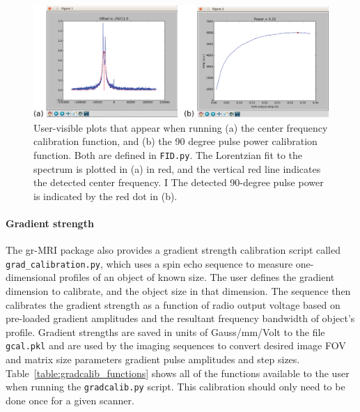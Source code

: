 \documentclass[review]{elsarticle}
\begin{document}
\begin{figure}[!ht]
\begin{center}
\includegraphics[width = \textwidth,trim=0 0 0 0,clip=false]{Fig7_fromChris/Fig7.eps}%
\caption{User-visible plots that appear when running (a) the center frequency calibration function, and (b) the 90 degree pulse power calibration function. Both are defined in \texttt{FID.py}.
The Lorentzian fit to the spectrum is plotted in (a) in red,
and the vertical red line indicates the detected center frequency. 
I The detected 90-degree pulse power 
is indicated by the red dot in (b).}
\label{fig:calib}
\end{center}
\end{figure}

\paragraph{Gradient strength} 
The gr-MRI package also provides a gradient strength calibration script called \texttt{grad\_calibration.py}, 
which uses a spin echo sequence to measure one-dimensional profiles of an object of known size.  
The user defines the gradient dimension to calibrate, and the object size in that dimension.
The sequence then calibrates the gradient strength as a function of radio output voltage based on pre-loaded gradient amplitudes 
and the resultant frequency bandwidth of object's profile.  
Gradient strengths are saved in units of Gauss/mm/Volt to the file \texttt{gcal.pkl} and are 
used by the imaging sequences to convert desired image FOV 
and matrix size parameters gradient pulse amplitudes and step sizes.
Table~\ref{table:gradcalib_functions} shows all of the functions available to the user when running the \texttt{gradcalib.py} script.
This calibration should only need to be done once for a given scanner. 
\end{document}

